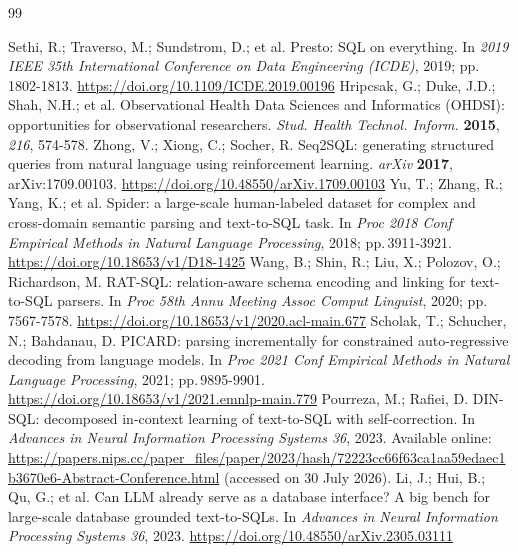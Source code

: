 \documentclass[11pt,a4paper]{article}
\newcommand{\doilink}[1]{\begingroup\urlstyle{same}\url{#1}\endgroup}
\begin{document}
\begin{thebibliography}{99}\footnotesize

 Sethi, R.; Traverso, M.; Sundstrom, D.; et al. Presto: SQL on everything. In \textit{2019 IEEE 35th International Conference on Data Engineering (ICDE)}, 2019; pp.\,1802-1813. \doilink{https://doi.org/10.1109/ICDE.2019.00196}
 Hripcsak, G.; Duke, J.D.; Shah, N.H.; et al. Observational Health Data Sciences and Informatics (OHDSI): opportunities for observational researchers. \textit{Stud. Health Technol. Inform.} \textbf{2015}, \textit{216}, 574-578. 
 Zhong, V.; Xiong, C.; Socher, R. Seq2SQL: generating structured queries from natural language using reinforcement learning. \textit{arXiv} \textbf{2017}, arXiv:1709.00103. \doilink{https://doi.org/10.48550/arXiv.1709.00103}
 Yu, T.; Zhang, R.; Yang, K.; et al. Spider: a large-scale human-labeled dataset for complex and cross-domain semantic parsing and text-to-SQL task. In \textit{Proc 2018 Conf Empirical Methods in Natural Language Processing}, 2018; pp.\,3911-3921. \doilink{https://doi.org/10.18653/v1/D18-1425}
 Wang, B.; Shin, R.; Liu, X.; Polozov, O.; Richardson, M. RAT-SQL: relation-aware schema encoding and linking for text-to-SQL parsers. In \textit{Proc 58th Annu Meeting Assoc Comput Linguist}, 2020; pp.\,7567-7578. \doilink{https://doi.org/10.18653/v1/2020.acl-main.677}
 Scholak, T.; Schucher, N.; Bahdanau, D. PICARD: parsing incrementally for constrained auto-regressive decoding from language models. In \textit{Proc 2021 Conf Empirical Methods in Natural Language Processing}, 2021; pp.\,9895-9901. \doilink{https://doi.org/10.18653/v1/2021.emnlp-main.779}
 Pourreza, M.; Rafiei, D. DIN-SQL: decomposed in-context learning of text-to-SQL with self-correction. In \textit{Advances in Neural Information Processing Systems 36}, 2023. Available online: \url{https://papers.nips.cc/paper_files/paper/2023/hash/72223cc66f63ca1aa59edaec1b3670e6-Abstract-Conference.html} (accessed on 30 July 2026). 
 Li, J.; Hui, B.; Qu, G.; et al. Can LLM already serve as a database interface? A big bench for large-scale database grounded text-to-SQLs. In \textit{Advances in Neural Information Processing Systems 36}, 2023. \doilink{https://doi.org/10.48550/arXiv.2305.03111}

\end{thebibliography}
\end{document}
